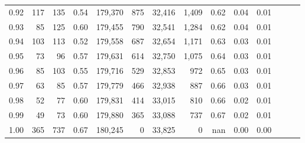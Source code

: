 \begin{tabular}{rrrrrrrrrrrrrr}
0.92 &    117 &  135 &  0.54 &  179,370 &      875 &  32,416 &   1,409 &  0.62 &  0.04 &      0.01 \\
0.93 &     85 &  125 &  0.60 &  179,455 &      790 &  32,541 &   1,284 &  0.62 &  0.04 &      0.01 \\
0.94 &    103 &  113 &  0.52 &  179,558 &      687 &  32,654 &   1,171 &  0.63 &  0.03 &      0.01 \\
0.95 &     73 &   96 &  0.57 &  179,631 &      614 &  32,750 &   1,075 &  0.64 &  0.03 &      0.01 \\
0.96 &     85 &  103 &  0.55 &  179,716 &      529 &  32,853 &     972 &  0.65 &  0.03 &      0.01 \\
0.97 &     63 &   85 &  0.57 &  179,779 &      466 &  32,938 &     887 &  0.66 &  0.03 &      0.01 \\
0.98 &     52 &   77 &  0.60 &  179,831 &      414 &  33,015 &     810 &  0.66 &  0.02 &      0.01 \\
0.99 &     49 &   73 &  0.60 &  179,880 &      365 &  33,088 &     737 &  0.67 &  0.02 &      0.01 \\
1.00 &    365 &  737 &  0.67 &  180,245 &        0 &  33,825 &       0 &   nan &  0.00 &      0.00 \\
\bottomrule
\end{tabular}
